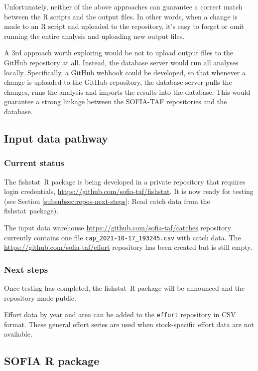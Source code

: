 \documentclass[12pt]{article}
\newcommand\blue[1]{\textcolor{darkblue}{#1}}
\newcommand\fishstat{{\sf fishstat}}
\begin{document}
Unfortunately, neither of the above approaches can guarantee a correct match
between the R scripts and the output files. In other words, when a change is
made to an R script and uploaded to the repository, it's easy to forget or omit
running the entire analysis and uploading new output files.

A 3rd approach worth exploring would be not to upload output files to the GitHub
repository at all. Instead, the database server would run all analyses locally.
Specifically, a GitHub webhook could be developed, so that whenever a change is
uploaded to the GitHub repository, the database server pulls the changes, runs
the analysis and imports the results into the database. This would guarantee a
strong linkage between the SOFIA-TAF repositories and the database.

\subsection{Input data pathway}

\subsubsection{Current status}

The \fishstat\ R package is being developed in a private repository that
requires login credentials, \blue{\url{https://github.com/sofia-taf/fishstat}}.
It is now ready for testing (see Section \ref{subsubsec:repos-next-steps}: Read
catch data from the \fishstat\ package).

The input data warehouse \blue{\url{https://github.com/sofia-taf/catches}}
repository currently contains one file \verb|cap_2021-10-17_193245.csv| with
catch data. The \blue{\url{https://github.com/sofia-taf/effort}} repository has
been created but is still empty.

\newpage

\subsubsection{Next steps}

Once testing has completed, the \fishstat\ R package will be announced and the
repository made public.

Effort data by year and area can be added to the \verb|effort| repository in CSV
format. These general effort series are used when stock-specific effort data are
not available.

\subsection{SOFIA R package}
\end{document}
